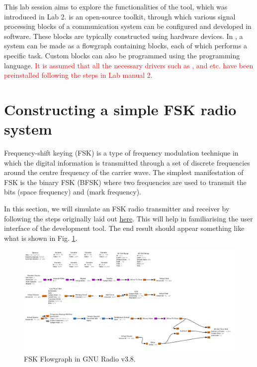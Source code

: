 \documentclass[11pt]{article}
\begin{document}
This lab session aims to explore the functionalities of the tool,  which was introduced in Lab 2.  is an open-source toolkit, through which various signal processing blocks of a communication system can be configured and developed in software. These blocks are typically constructed using hardware devices. In , a system can be made as a flowgraph containing blocks, each of which performs a specific task. Custom blocks can also be programmed using the  programming language. \textcolor{red}{It is assumed that all the necessary drivers such as , and  etc. have been preinstalled following the steps in Lab manual 2.}

\section{Constructing a simple FSK radio system}

Frequency-shift keying (FSK) is a type of frequency modulation technique in which the digital information is transmitted through a set of discrete frequencies around the centre frequency of the carrier wave. The simplest manifestation of FSK is the binary FSK (BFSK) where two frequencies are used to transmit the bits  (space frequency) and   (mark frequency).

In this section, we will simulate an FSK radio transmitter and receiver by following the steps originally laid out \href{https://wiki.gnuradio.org/index.php/Simulation_example:_FSK}{here}. This will help in familiarising the user interface of the development tool. The end result should appear something like what is shown in Fig. \ref{fig:image2}.


\begin{figure}[!htb]
  \centering
  \includegraphics[width=.95\textwidth]{image4.png}
  \caption{FSK Flowgraph in GNU Radio v3.8.}
  \label{fig:image2}
\end{figure}
\end{document}
